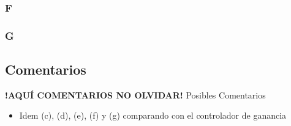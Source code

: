 \FloatBarrier
\subsubsection{F}%

\FloatBarrier
\subsubsection{G}%


\FloatBarrier
\subsection{Comentarios}


\textbf{!AQUÍ COMENTARIOS NO OLVIDAR!}
Posibles Comentarios
\begin{itemize}
    \item Idem (c), (d), (e), (f) y (g) comparando con el controlador de ganancia
\end{itemize}